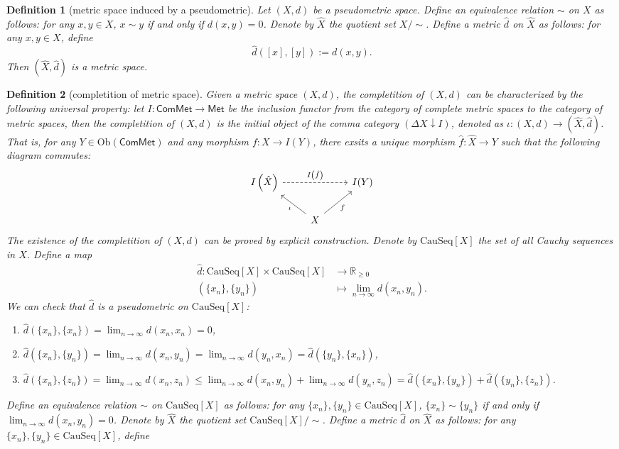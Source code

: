 \documentclass{report}
\newtheorem{definition}{Definition}[section]
\theoremstyle{nonumberplain}
\begin{document}
\begin{definition}[metric space induced by a pseudometric]
	Let $(X,d)$ be a pseudometric space. Define an equivalence relation $\sim$ on $X$ as follows: for any $x,y\in X$, $x\sim y$ if and only if $d(x,y)=0$. Denote by $\hat{X}$ the quotient set $X/\sim$. Define a metric $\hat{d}$ on $\hat{X}$ as follows: for any $x,y\in X$, define
	\[
		\hat{d}([x],[y]):=d(x,y).
	\]
	Then $(\hat{X},\hat{d})$ is a metric space.
\end{definition}

\begin{definition}[completition of metric space]
	Given a metric space $(X,d)$, the \emph{completition} of $(X,d)$ can be characterized by the following universal property: let $I: \mathsf{ComMet}\to\mathsf{Met}$ be the inclusion functor from the category of complete metric spaces to the category of metric spaces, then the \emph{completition of $(X,d)$} is the initial object of the comma category $\left(\Delta X\downarrow I\right)$, denoted as $\iota:(X,d)\to\left(\hat{X},\hat{d}\right)$. That is, for any $Y\in\mathrm{Ob}(\mathsf{ComMet})$ and any morphism $f:X\to I(Y)$, there exsits a unique morphism $\hat{f}:\hat{X}\to Y$ such that the following diagram commutes:
	\[
		\begin{tikzcd}
			I\left(\hat{X}\right) \arrow[rr, "I\left(\hat{f}\right)", dashed] &                                        & I(Y) \\
																			  & X \arrow[lu, "\iota"] \arrow[ru, "f"'] &     
	\end{tikzcd}
	\]
	The existence of the completition of $(X,d)$ can be proved by explicit construction. Denote by $\mathrm{CauSeq}[X]$ the set of all Cauchy sequences in $X$. Define a map
	\begin{align*}
		\hat{d}:\mathrm{CauSeq}[X]\times\mathrm{CauSeq}[X]&\to\mathbb{R}_{\ge 0}\\
		\left(\{x_n\},\{y_n\}\right)&\mapsto\lim_{n\to\infty}d(x_n,y_n).
	\end{align*}
	We can check that $\hat{d}$ is a pseudometric on $\mathrm{CauSeq}[X]$:
	\begin{enumerate}
		\item $\hat{d}(\{x_n\},\{x_n\})=\lim_{n\to\infty}d(x_n,x_n)=0$,
		\item $\hat{d}(\{x_n\},\{y_n\})=\lim_{n\to\infty}d(x_n,y_n)=\lim_{n\to\infty}d(y_n,x_n)=\hat{d}(\{y_n\},\{x_n\})$,
		\item $\hat{d}(\{x_n\},\{z_n\})=\lim_{n\to\infty}d(x_n,z_n)\le\lim_{n\to\infty}d(x_n,y_n)+\lim_{n\to\infty}d(y_n,z_n)=\hat{d}(\{x_n\},\{y_n\})+\hat{d}(\{y_n\},\{z_n\})$.
	\end{enumerate}
	
	
	Define an equivalence relation
	$\sim$ on $\mathrm{CauSeq}[X]$ as follows: for any $\{x_n\},\{y_n\}\in\mathrm{CauSeq}[X]$, $\{x_n\}\sim\{y_n\}$ if and only if $\lim_{n\to\infty}d(x_n,y_n)=0$. Denote by $\hat{X}$ the quotient set $\mathrm{CauSeq}[X]/\sim$. Define a metric $\hat{d}$ on $\hat{X}$ as follows: for any $\{x_n\},\{y_n\}\in\mathrm{CauSeq}[X]$, define
\end{definition}
\end{document}
